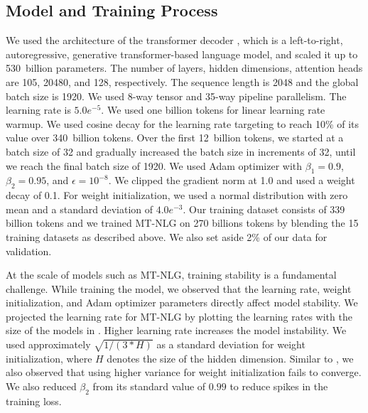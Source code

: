 \documentclass[11pt]{article}
\newcommand{\ours}{MT-NLG}
\begin{document}
\subsection{Model and Training Process}
\label{sec:modelconfig}

We used the architecture of the transformer decoder \cite{gpt2-radford2019language}, which is a left-to-right, autoregressive, generative transformer-based language model, and scaled it up to 530~billion parameters.
The number of layers, hidden dimensions, attention heads are 105, 20480, and 128, respectively. The sequence length is 2048 and the global batch size is 1920. We used 8-way tensor and 35-way pipeline parallelism. The learning rate is $5.0 e^{-5}$. We used one billion tokens for linear learning rate warmup. We used cosine decay for the learning rate targeting to reach 10\% of its value over 340~billion tokens. Over the first 12~billion tokens, we started at a batch size of 32 and gradually increased the batch size in increments of 32, until we reach the final batch size of 1920.
We used Adam optimizer with $\beta_1 = 0.9$, $\beta_2 = 0.95$, and $\epsilon = 10^{-8}$. We clipped the gradient norm at 1.0 and used a weight decay of 0.1. For weight initialization, we used a normal distribution with zero mean and a standard deviation of $4.0 e^{-3}$. Our training dataset consists of 339 billion tokens and we trained {\ours} on 270 billions tokens  by blending the 15 training datasets as described above. We also set aside 2\% of our data for validation.

At the scale of models such as {\ours}, training stability is a fundamental challenge. While training the model, we observed that the learning rate, weight initialization, and Adam optimizer parameters directly affect model stability. We projected the learning rate for {\ours} by plotting the learning rates with the size of the models in \cite{brown2020language}. Higher 
learning rate increases the model instability. We used approximately $\sqrt{1/(3*H)}$ as a standard deviation for weight initialization, where $H$ denotes the size of the hidden dimension. Similar to \cite{DBLP:journals/corr/abs-1910-05895}, we also observed that using higher variance for weight initialization fails to converge. We also reduced $\beta_2$ from its standard value of $0.99$ to reduce spikes in the training loss. 
\end{document}
